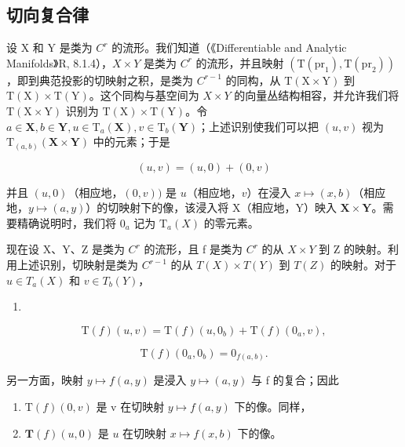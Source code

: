 \subsection{切向复合律}

设 X 和 Y 是类为 \(C^{r}\) 的流形。我们知道（《Differentiable and Analytic Manifolds》R, 8.1.4），\(X \times Y\) 是类为 \(C^{r}\) 的流形，并且映射 \((\mathrm{T}(\mathrm{pr}_{1}), \mathrm{T}(\mathrm{pr}_{2}))\)，即到典范投影的切映射之积，是类为 \(C^{r-1}\) 的同构，从 \(\mathrm{T}(\mathrm{X} \times \mathrm{Y})\) 到 \(\mathrm{T}(\mathrm{X}) \times \mathrm{T}(\mathrm{Y})\)。这个同构与基空间为 \(X \times Y\) 的向量丛结构相容，并允许我们将 \(\mathrm{T}(\mathrm{X} \times \mathrm{Y})\) 识别为 \(\mathrm{T}(\mathrm{X}) \times \mathrm{T}(\mathrm{Y})\)。令 \(a \in \mathbf{X}, b \in \mathbf{Y}, u \in \mathrm{T}_a(\mathbf{X}), v \in \mathrm{T}_b(\mathbf{Y})\)；上述识别使我们可以把 \((u, v)\) 视为 \(\mathrm{T}_{(a,b)}(\mathbf{X} \times \mathbf{Y})\) 中的元素；于是

\[
(u, v) = (u, 0) + (0, v)
\]

并且 \((u,0)\)（相应地，\((0,v))\) 是 \(u\)（相应地，\(v\)）在浸入 \(x\mapsto (x,b)\)（相应地，\(y\mapsto (a,y)\)）的切映射下的像，该浸入将 X（相应地，Y）映入 \(\mathbf{X}\times \mathbf{Y}\)。需要精确说明时，我们将 \(0_{a}\) 记为 \(\mathrm{T}_a(X)\) 的零元素。

现在设 X、Y、Z 是类为 \(C^{r}\) 的流形，且 f 是类为 \(C^{r}\) 的从 \(X \times Y\) 到 Z 的映射。利用上述识别，切映射是类为 \(C^{r-1}\) 的从 \(T(X) \times T(Y)\) 到 \(T(Z)\) 的映射。对于 \(u \in T_{a}(X)\) 和 \(v \in T_{b}(Y)\)，

\begin{enumerate}
\def\labelenumi{(\arabic{enumi})}
\tightlist
\item
\end{enumerate}

\[
\mathrm{T} (f) (u, v) = \mathrm{T} (f) (u, 0 _ {b}) + \mathrm{T} (f) (0 _ {a}, v),
\]

\[
\mathrm{T} (f) \left(0 _ {a}, 0 _ {b}\right) = 0 _ {f (a, b)}.\tag{2}
\]

另一方面，映射 \(y \mapsto f(a, y)\) 是浸入 \(y \mapsto (a, y)\) 与 f 的复合；因此

\begin{enumerate}
\def\labelenumi{(\arabic{enumi})}
\setcounter{enumi}{2}
\item
  \(\mathrm{T}(f)(0,v)\) 是 v 在切映射 \(y\mapsto f(a,y)\) 下的像。同样，
\item
  \(\mathbf{T}(f)(u,0)\) 是 \(u\) 在切映射 \(x\mapsto f(x,b)\) 下的像。
\end{enumerate}

